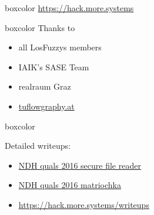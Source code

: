 {
\begin{frame}[plain]



  \begin{center}
  	\begin{beamercolorbox}[sep=0.5em,wd=10cm]{boxcolor}
	    \color{white}
	    {\huge \url{https://hack.more.systems}}
	\end{beamercolorbox}
  \end{center}

  \vspace{3em}


  \begin{beamercolorbox}[sep=1em,wd=5cm]{boxcolor}
    Thanks to

    \begin{itemize}
      \item all LosFuzzys members
      \item IAIK's SASE Team
      \item realraum Graz
      \item \url{tuflowgraphy.at}
    \end{itemize}


  \end{beamercolorbox}

\end{frame}


\begin{frame}[plain]

	\begin{beamercolorbox}[sep=1em,wd=7cm]{boxcolor}

		Detailed writeups:

		{\footnotesize
		  \begin{itemize}
		    \item \href{https://losfuzzys.github.io/writeup/2016/04/04/ndhquals2016-secure-file-reader/}
		      {NDH quals 2016 secure file reader}
		    \item \href{https://losfuzzys.github.io/writeup/2016/04/04/ndhquals2016-matriochka/}
		      {NDH quals 2016 matriochka}
		     \item \url{https://hack.more.systems/writeups}
		  \end{itemize}
		}
	\end{beamercolorbox}

\end{frame}
}
